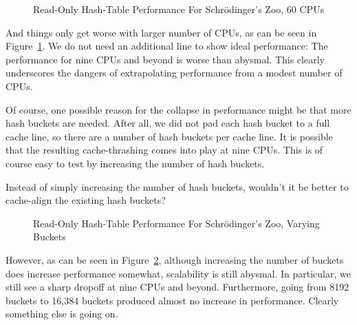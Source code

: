 \begin{figure}[tb]
\centering
{}
\caption{Read-Only Hash-Table Performance For Schr\"odinger's Zoo, 60 CPUs}
\label{fig:datastruct:Read-Only Hash-Table Performance For Schroedinger's Zoo, 60 CPUs}
\end{figure}

And things only get worse with larger number of CPUs, as can be seen in
Figure~\ref{fig:datastruct:Read-Only Hash-Table Performance For Schroedinger's Zoo, 60 CPUs}.
We do not need an additional line to show ideal performance: The performance
for nine CPUs and beyond is worse than abysmal.
This clearly underscores the dangers of extrapolating performance from a
modest number of CPUs.

Of course, one possible reason for the collapse in performance might be
that more hash buckets are needed.
After all, we did not pad each hash bucket to a full cache line, so
there are a number of hash buckets per cache line.
It is possible that the resulting cache-thrashing comes into play at
nine CPUs.
This is of course easy to test by increasing the number of hash buckets.

\QuickQuiz{}
	Instead of simply increasing the number of hash buckets,
	wouldn't it be better to cache-align the existing hash buckets?
 \QuickQuizEnd


\begin{figure}[tb]
\centering
{}
\caption{Read-Only Hash-Table Performance For Schr\"odinger's Zoo, Varying Buckets}
\label{fig:datastruct:Read-Only Hash-Table Performance For Schroedinger's Zoo, Varying Buckets}
\end{figure}

However, as can be seen in
Figure~\ref{fig:datastruct:Read-Only Hash-Table Performance For Schroedinger's Zoo, Varying Buckets},
although increasing the number of buckets does increase performance somewhat,
scalability is still abysmal.
In particular, we still see a sharp dropoff at nine CPUs and beyond.
Furthermore, going from 8192 buckets to 16,384 buckets produced almost
no increase in performance.
Clearly something else is going on.

